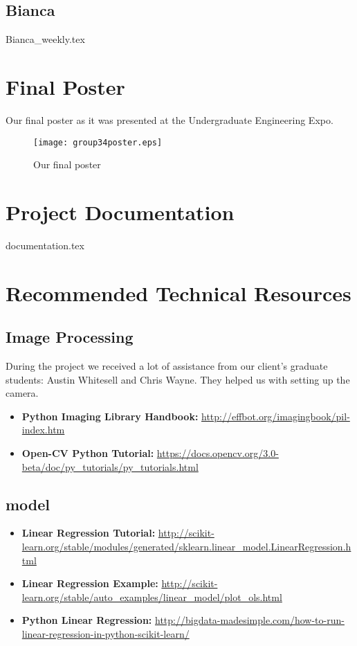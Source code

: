 \documentclass[onecolumn, draftclsnofoot,10pt, compsoc]{IEEEtran}
\begin{document}
	\subsection{Bianca}
	{Bianca_weekly.tex}
	\newpage
	\section{Final Poster}	
		Our final poster as it was presented at the Undergraduate Engineering Expo. 	
		\begin{figure}[!hb]
			\centering
			\texttt{[image: group34poster.eps]}
			\caption{Our final poster}
		\end{figure}

	\section{Project Documentation}
	{documentation.tex}
	
	\section{Recommended Technical Resources}
		\subsection{Image Processing}
		During the project we received a lot of assistance from our client's graduate students: Austin Whitesell and Chris Wayne. They helped us with setting up the camera.   
		\begin{itemize}
			\item \textbf{Python Imaging Library Handbook:}    \url{http://effbot.org/imagingbook/pil-index.htm}
			\item \textbf{Open-CV Python Tutorial:}    \url{https://docs.opencv.org/3.0-beta/doc/py_tutorials/py_tutorials.html}
		\end{itemize}
		\subsection{model}
		\begin{itemize}
			\item \textbf{Linear Regression Tutorial:}    \url{http://scikit-learn.org/stable/modules/generated/sklearn.linear_model.LinearRegression.html}
			\item \textbf{Linear Regression Example:}    \url{http://scikit-learn.org/stable/auto_examples/linear_model/plot_ols.html}
			\item \textbf{Python Linear Regression:}    \url{http://bigdata-madesimple.com/how-to-run-linear-regression-in-python-scikit-learn/}
		\end{itemize}
\end{document}

